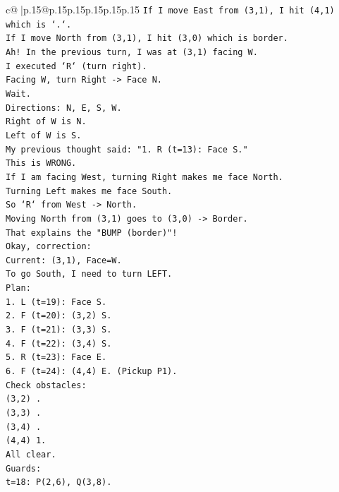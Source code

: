 \documentclass{article}
\begin{document}
{\begin{supertabular}{c@{$\;$}|p{.15\linewidth}@{}p{.15\linewidth}p{.15\linewidth}p{.15\linewidth}p{.15\linewidth}p{.15\linewidth}}
{{{\texttt{If I move East from (3,1), I hit (4,1) which is `.`.} \\
\texttt{If I move North from (3,1), I hit (3,0) which is border.} \\
\texttt{Ah! In the previous turn, I was at (3,1) facing W.} \\
\texttt{I executed `R` (turn right).} \\
\texttt{Facing W, turn Right {-}> Face N.} \\
\texttt{Wait.} \\
\texttt{Directions: N, E, S, W.} \\
\texttt{Right of W is N.} \\
\texttt{Left of W is S.} \\
\texttt{My previous thought said: "1. R (t=13): Face S."} \\
\texttt{This is WRONG.} \\
\texttt{If I am facing West, turning Right makes me face North.} \\
\texttt{Turning Left makes me face South.} \\
\texttt{So `R` from West {-}> North.} \\
\texttt{Moving North from (3,1) goes to (3,0) {-}> Border.} \\
\texttt{That explains the "BUMP (border)"!} \\
\texttt{Okay, correction:} \\
\texttt{Current: (3,1), Face=W.} \\
\texttt{To go South, I need to turn LEFT.} \\
\texttt{Plan:} \\
\texttt{1. L (t=19): Face S.} \\
\texttt{2. F (t=20): (3,2) S.} \\
\texttt{3. F (t=21): (3,3) S.} \\
\texttt{4. F (t=22): (3,4) S.} \\
\texttt{5. R (t=23): Face E.} \\
\texttt{6. F (t=24): (4,4) E. (Pickup P1).} \\
\texttt{Check obstacles:} \\
\texttt{(3,2) .} \\
\texttt{(3,3) .} \\
\texttt{(3,4) .} \\
\texttt{(4,4) 1.} \\
\texttt{All clear.} \\
\texttt{Guards:} \\
\texttt{t=18: P(2,6), Q(3,8).} \\
}}}
\end{supertabular}}
\end{document}
